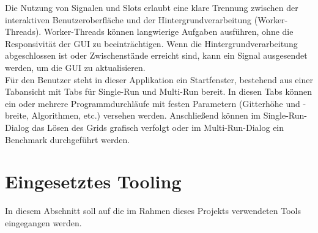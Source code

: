 Die Nutzung von Signalen und Slots erlaubt eine klare Trennung zwischen der interaktiven Benutzeroberfläche und der Hintergrundverarbeitung (Worker-Threads).
Worker-Threads können langwierige Aufgaben ausführen, ohne die Responsivität der GUI zu beeinträchtigen.
Wenn die Hintergrundverarbeitung abgeschlossen ist oder Zwischenstände erreicht sind, kann ein Signal ausgesendet werden, um die GUI zu aktualisieren. \cite{Qt52024}\\
Für den Benutzer steht in dieser Applikation ein Startfenster, bestehend aus einer Tabansicht mit Tabs für Single-Run und Multi-Run bereit.
In diesen Tabs können ein oder mehrere Programmdurchläufe mit festen Parametern (Gitterhöhe und -breite, Algorithmen, etc.) versehen werden.
Anschließend können im Single-Run-Dialog das Lösen des Grids grafisch verfolgt oder im Multi-Run-Dialog ein Benchmark durchgeführt werden.

\chapter{Eingesetztes Tooling}
\label{ch:tooling}
In diesem Abschnitt soll auf die im Rahmen dieses Projekts verwendeten Tools eingegangen werden.
